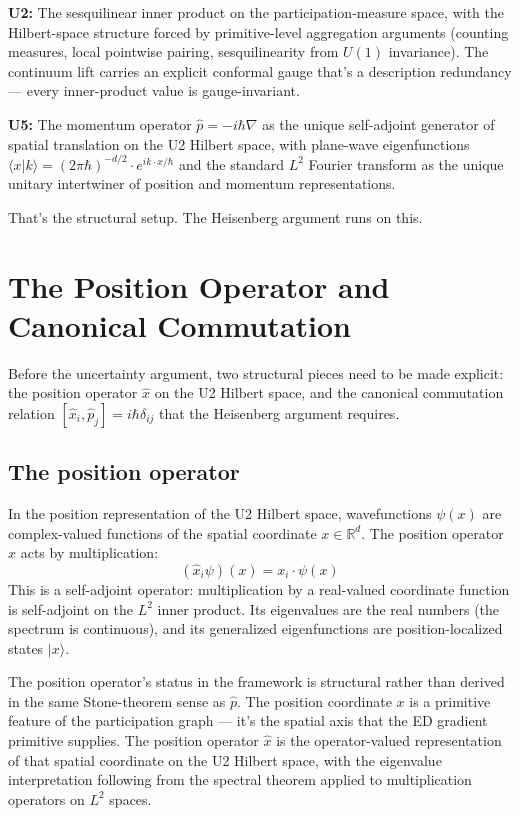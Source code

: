 \documentclass[11pt,a4paper]{article}
\begin{document}
\textbf{U2:} The sesquilinear inner product on the participation-measure space, with the Hilbert-space structure forced by primitive-level aggregation arguments (counting measures, local pointwise pairing, sesquilinearity from $U(1)$ invariance). The continuum lift carries an explicit conformal gauge that's a description redundancy --- every inner-product value is gauge-invariant.

\textbf{U5:} The momentum operator $\hat{p} = -i\hbar\nabla$ as the unique self-adjoint generator of spatial translation on the U2 Hilbert space, with plane-wave eigenfunctions $\langle x|k\rangle = (2\pi\hbar)^{-d/2}\cdot e^{ik\cdot x/\hbar}$ and the standard $L^2$ Fourier transform as the unique unitary intertwiner of position and momentum representations.

That's the structural setup. The Heisenberg argument runs on this.

\section{The Position Operator and Canonical Commutation}

Before the uncertainty argument, two structural pieces need to be made explicit: the position operator $\hat{x}$ on the U2 Hilbert space, and the canonical commutation relation $[\hat{x}_i, \hat{p}_j] = i\hbar\delta_{ij}$ that the Heisenberg argument requires.

\subsection{The position operator}

In the position representation of the U2 Hilbert space, wavefunctions $\psi(x)$ are complex-valued functions of the spatial coordinate $x \in \mathbb{R}^d$. The position operator $\hat{x}$ acts by multiplication:
\[
(\hat{x}_i \psi)(x) = x_i \cdot \psi(x)
\]
This is a self-adjoint operator: multiplication by a real-valued coordinate function is self-adjoint on the $L^2$ inner product. Its eigenvalues are the real numbers (the spectrum is continuous), and its generalized eigenfunctions are position-localized states $|x\rangle$.

The position operator's status in the framework is structural rather than derived in the same Stone-theorem sense as $\hat{p}$. The position coordinate $x$ is a primitive feature of the participation graph --- it's the spatial axis that the ED gradient primitive supplies. The position operator $\hat{x}$ is the operator-valued representation of that spatial coordinate on the U2 Hilbert space, with the eigenvalue interpretation following from the spectral theorem applied to multiplication operators on $L^2$ spaces.
\end{document}
